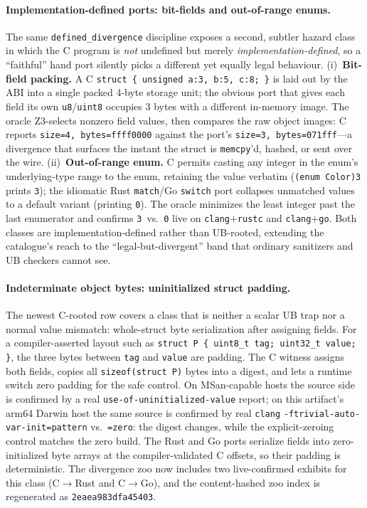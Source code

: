 \documentclass[10pt,a4paper]{article}
\begin{document}
\paragraph{Implementation-defined ports: bit-fields and out-of-range enums.}
The same \texttt{defined\_divergence} discipline exposes a second, subtler
hazard class in which the C program is \emph{not} undefined but merely
\emph{implementation-defined}, so a ``faithful'' hand port silently picks a
different yet equally legal behaviour. (i)~\textbf{Bit-field packing.} A C
\texttt{struct \{ unsigned a:3, b:5, c:8; \}} is laid out by the ABI into a
single packed 4-byte storage unit; the obvious port that gives each field its
own \texttt{u8}/\texttt{uint8} occupies 3 bytes with a different in-memory
image. The oracle Z3-selects nonzero field values, then compares the raw object
images: C reports \texttt{size=4, bytes=ffff0000} against the port's
\texttt{size=3, bytes=071fff}---a divergence that surfaces the instant the
struct is \texttt{memcpy}'d, hashed, or sent over the wire. (ii)~\textbf{Out-of-range
enum.} C permits casting any integer in the enum's underlying-type range to the
enum, retaining the value verbatim (\texttt{(enum Color)3} prints \texttt{3});
the idiomatic Rust \texttt{match}/Go \texttt{switch} port collapses unmatched
values to a default variant (printing \texttt{0}). The oracle minimizes the
least integer past the last enumerator and confirms \texttt{3}~vs.~\texttt{0}
live on \texttt{clang}+\texttt{rustc} and \texttt{clang}+\texttt{go}. Both
classes are implementation-defined rather than UB-rooted, extending the
catalogue's reach to the ``legal-but-divergent'' band that ordinary
sanitizers and UB checkers cannot see.

\paragraph{Indeterminate object bytes: uninitialized struct padding.}
The newest C-rooted row covers a class that is neither a scalar UB trap nor a
normal value mismatch: whole-struct byte serialization after assigning fields.
For a compiler-asserted layout such as
\texttt{struct P \{ uint8\_t tag; uint32\_t value; \}}, the three bytes between
\texttt{tag} and \texttt{value} are padding.  The C witness assigns both fields,
copies all \texttt{sizeof(struct P)} bytes into a digest, and lets a runtime
switch zero padding for the safe control.  On MSan-capable hosts the source side
is confirmed by a real \texttt{use-of-uninitialized-value} report; on this
artifact's arm64 Darwin host the same source is confirmed by real \texttt{clang}
\texttt{-ftrivial-auto-var-init=pattern} vs.\ \texttt{=zero}: the digest changes,
while the explicit-zeroing control matches the zero build.  The Rust and Go ports
serialize fields into zero-initialized byte arrays at the compiler-validated C
offsets, so their padding is deterministic.  The divergence zoo now includes two
live-confirmed exhibits for this class (C$\to$Rust and C$\to$Go), and the
content-hashed zoo index is regenerated as
\texttt{2eaea983dfa45403}.
\end{document}
